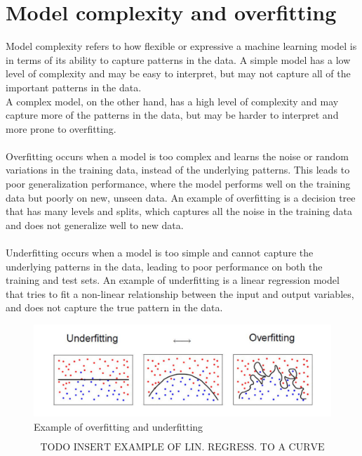 \documentclass{article}
\begin{document}
\section{Model complexity and overfitting}
Model complexity refers to how flexible or expressive a machine learning model is in terms of its ability to capture patterns in the data. A simple model has a low level of complexity and may be easy to interpret, but may not capture all of the important patterns in the data.\\
A complex model, on the other hand, has a high level of complexity and may capture more of the patterns in the data, but may be harder to interpret and more prone to overfitting.\\\\
Overfitting occurs when a model is too complex and learns the noise or random variations in the training data, instead of the underlying patterns. This leads to poor generalization performance, where the model performs well on the training data but poorly on new, unseen data. An example of overfitting is a decision tree that has many levels and splits, which captures all the noise in the training data and does not generalize well to new data.\\\\
Underfitting occurs when a model is too simple and cannot capture the underlying patterns in the data, leading to poor performance on both the training and test sets. An example of underfitting is a linear regression model that tries to fit a non-linear relationship between the input and output variables, and does not capture the true pattern in the data.
\begin{figure}[!ht]
    \centering
    \includegraphics[width=\textwidth]{./images/p93_img447.png}
    \caption{Example of overfitting and underfitting}
\end{figure}

\[\text{TODO INSERT EXAMPLE OF LIN. REGRESS. TO A CURVE}\]
\end{document}
